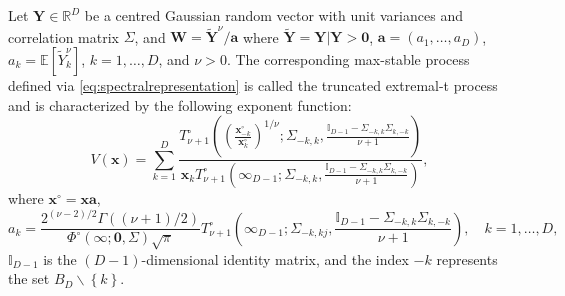\documentclass[lineno]{biometrika}
\begin{document}

\begin{theorem}
\label{thm:truncated_extremal_t}    
Let $\bm Y \in \mathbb{R}^D$ be a centred Gaussian random vector with unit variances and correlation matrix $\Sigma$, and $\bm W= 
\tilde{\bm Y}^{\nu} / \bm a$
where $\tilde {\bm Y} = \bm Y | \bm Y > \bm 0$, $\bm a = (a_1, \ldots, a_D)$, $a_k=\mathbb E[\tilde Y_k^\nu]$, $k=1, \ldots, D$, and $\nu>0$. The corresponding max-stable process defined via \eqref{eq:spectralrepresentation} is called the truncated extremal-t process and is characterized by the following exponent function:
%
\begin{equation}
\label{eq:V_tet}
V(\bm x) = \sum_{k=1}^D \frac{T_{\nu+1}^\circ\left( \left(\frac{\bm x_{-k}^\circ}{\bm x_{k}^\circ}\right)^{1/\nu} ;\Sigma_{-k,k},\frac{\mathbb{I}_{D-1}-\Sigma_{-k,k}\Sigma_{k,-k} }{\nu+1}\right)}{\bm x_k T_{\nu+1}^\circ\left(\bm \infty_{D-1};\Sigma_{-k,k}, \frac{\mathbb{I}_{D-1}-\Sigma_{-k,k} \Sigma_{k,-k}}{\nu+1}\right)},
\end{equation}
%
where $\bm x^\circ = \bm x \bm a$,
%
\begin{equation*}
a_k =\frac{2^{(\nu-2)/2}\Gamma((\nu+1)/2)}{\Phi^\circ(\bm \infty;\bm 0, \Sigma) \sqrt{\pi}} T_{\nu+1}^\circ\left(
\bm \infty_{D-1};
\Sigma_{-k,kj}, \frac{\mathbb{I}_{D-1} -\Sigma_{-k,k} \Sigma_{k,-k}}{\nu+1} \right), \quad k=1,\dots,D,	    
\end{equation*}
%
$\mathbb{I}_{D-1}$ is the $(D-1)$-dimensional identity matrix, and the index $-k$ represents the set $B_D \backslash \left\{ k\right\}$.
\end{theorem}
\end{document}
